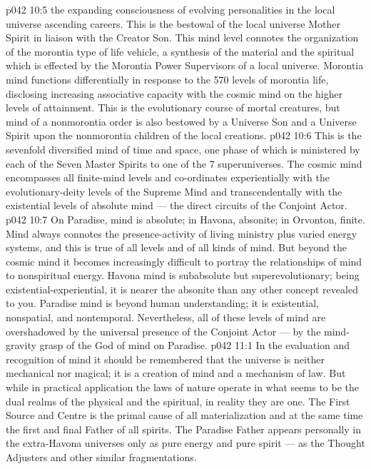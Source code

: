 \vs p042 10:5 \bibnobreakspace {} the expanding consciousness of evolving personalities in the local universe ascending careers. This is the bestowal of the local universe Mother Spirit in liaison with the Creator Son. This mind level connotes the organization of the morontia type of life vehicle, a synthesis of the material and the spiritual which is effected by the Morontia Power Supervisors of a local universe. Morontia mind functions differentially in response to the 570 levels of morontia life, disclosing increasing associative capacity with the cosmic mind on the higher levels of attainment. This is the evolutionary course of mortal creatures, but mind of a nonmorontia order is also bestowed by a Universe Son and a Universe Spirit upon the nonmorontia children of the local creations.
\vs p042 10:6 \pc {} This is the sevenfold diversified mind of time and space, one phase of which is ministered by each of the Seven Master Spirits to one of the 7 superuniverses. The cosmic mind encompasses all finite\hyp{}mind levels and co\hyp{}ordinates experientially with the evolutionary\hyp{}deity levels of the Supreme Mind and transcendentally with the existential levels of absolute mind --- the direct circuits of the Conjoint Actor.
\vs p042 10:7 On Paradise, mind is absolute; in Havona, absonite; in Orvonton, finite. Mind always connotes the presence\hyp{}activity of living ministry plus varied energy systems, and this is true of all levels and of all kinds of mind. But beyond the cosmic mind it becomes increasingly difficult to portray the relationships of mind to nonspiritual energy. Havona mind is subabsolute but superevolutionary; being existential\hyp{}experiential, it is nearer the absonite than any other concept revealed to you. Paradise mind is beyond human understanding; it is existential, nonspatial, and nontemporal. Nevertheless, all of these levels of mind are overshadowed by the universal presence of the Conjoint Actor --- by the mind\hyp{}gravity grasp of the God of mind on Paradise.
\vs p042 11:1 In the evaluation and recognition of mind it should be remembered that the universe is neither mechanical nor magical; it is a creation of mind and a mechanism of law. But while in practical application the laws of nature operate in what seems to be the dual realms of the physical and the spiritual, in reality they are one. The First Source and Centre is the primal cause of all materialization and at the same time the first and final Father of all spirits. The Paradise Father appears personally in the extra\hyp{}Havona universes only as pure energy and pure spirit --- as the Thought Adjusters and other similar fragmentations.
